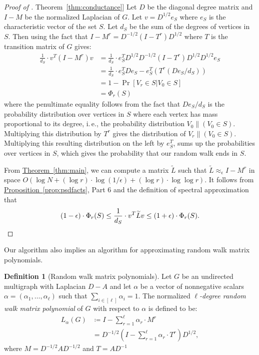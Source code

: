 \documentclass[11pt]{article}
\numberwithin{equation}{section}
\theoremstyle{definition}
\newtheorem{definition}[theorem]{Definition}
\theoremstyle{plain}
\newcommand{\ie}{i.\,e.}
\newcommand{\expref}[2]{\hyperref[#2]{#1~\ref{#2}}}
\newcommand{\wt}{\widetilde}   %
\newcommand{\SC}{O(\log N + (\log r)\cdot\log(1/\epsilon)+(\log r)\cdot \log\log r)}
\numberwithin{myalgctr}{section}
\theoremstyle{named}
\begin{document}
\begin{proof}[Proof of \expref{Theorem}{thm:conductance}]
Let $D$ be the diagonal degree matrix and $I-M$ be the normalized Laplacian of $G$. Let $v=D^{1/2}e_S$ where $e_S$ is the characteristic vector of the set $S$. Let $d_S$ be the sum of the degrees of vertices in $S$. Then using the fact that $I-M^r=D^{-1/2}(I-T^r)D^{1/2}$ where $T$ is the transition matrix of $G$ gives:
\begin{align*}
\frac{1}{d_S}\cdot v^{T}(I-M^r)v &= \frac{1}{d_S}\cdot e_S^{T}D^{1/2}D^{-1/2}(I-T^r)D^{1/2}D^{1/2}e_S \\
&=\frac{1}{d_S}\cdot e_S^{T}De_{S} -  e_S^{T}(T^{r}(De_S/d_S))\\
&=1-\Pr[V_r\in S| V_0\in S]\\
&=\Phi_r(S)
\end{align*}
where the penultimate equality follows from the fact that $De_S/d_S$ is the probability distribution over vertices in $S$ where each vertex has mass proportional to its degree, \ie, the probability distribution $V_0\|(V_0\in S)$. Multiplying this distribution by $T^r$ gives the distribution of $V_r\|(V_0\in S)$. Multiplying this resulting distribution on the left by $e_S^{T}$, sums up the probabilities over vertices in $S$, which gives the probability that our random walk ends in $S$. 

{}From \expref{Theorem}{thm:main}, we can compute a matrix $\wt{L}$ such that $\wt{L}\approx_{\epsilon} I-M^r$ in space $\SC$. It follows from \expref{Proposition}{prop:psdfacts}, Part 6 and the definition of spectral approximation that 
\[
(1-\epsilon)\cdot \Phi_{r}(S)\leq \frac{1}{d_S}\cdot v^{T}\wt{L}v\leq (1+\epsilon)\cdot \Phi_{r}(S).    \qedhere
\]
\end{proof}
Our algorithm also implies an algorithm for approximating random walk matrix polynomials.
\begin{definition}[Random walk matrix polynomials]
Let $G$ be an undirected multigraph with Laplacian $D-A$ and let $\alpha$ be a vector of nonnegative scalars $\alpha=(\alpha_1,\ldots,\alpha_{\ell})$ such that $\sum_{i\in[\ell]}\alpha_i=1$. The normalized \emph{$\ell$-degree random walk matrix polynomial} of $G$ with respect to $\alpha$ is defined to be:
\begin{align*}
L_{\alpha}(G)&\coloneqq I-\sum_{r=1}^{\ell}\alpha_{r}\cdot M^r\\
&=D^{-1/2}\left(I-\sum_{r=1}^{\ell}\alpha_r\cdot T^r\right)D^{1/2},
\end{align*}
where $M=D^{-1/2}AD^{-1/2}$ and $T=AD^{-1}$
\end{definition}
\end{document}

